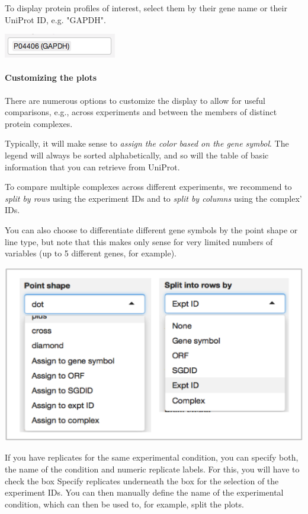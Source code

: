 \documentclass[letterpaper, twocolumn, 9pt]{article}
\begin{document}
To display protein profiles of interest, select them by their gene name or their UniProt ID, e.g. "GAPDH".

\includegraphics[width=.5\columnwidth]{figures/ss_uniprot_entry.png}


\paragraph*{Customizing the plots}
There are numerous options to customize the display to allow for useful comparisons, e.g., across experiments and between the members of distinct protein complexes.

Typically, it will make sense to \textit{assign the color based on the gene symbol}.
The legend will always be sorted alphabetically, and so will the table of basic information that you can retrieve from UniProt.

To compare multiple complexes across different experiments, we recommend to \textit{split by rows} using the experiment IDs and to \textit{split by columns} using the complex' IDs.

You can also choose to differentiate different gene symbols by the point shape or line type, but note that this makes only sense for very limited numbers of variables (up to 5 different genes, for example).

\includegraphics[width=\columnwidth]{figures/ss_plotOptions.png}

If you have replicates for the same experimental condition, you can specify both, the name of the condition and numeric replicate labels.
For this, you will have to check the box \textsf{Specify replicates} underneath the box for the selection of the experiment IDs.
You can then manually define the name of the experimental condition, which can then be used  to, for example, split the plots.
\end{document}
